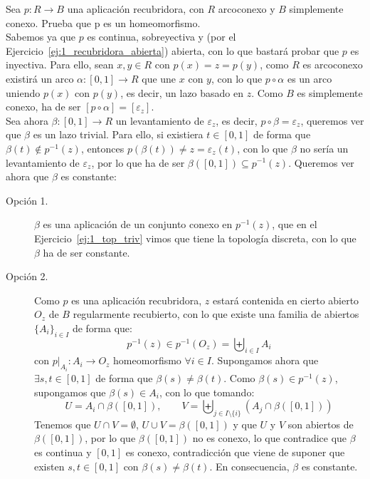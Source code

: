\begin{ejercicio}
   Sea $p:R\to B$ una aplicación recubridora, con $R$ arcoconexo y $B$ simplemente conexo. Prueba que p es un homeomorfismo.\\

   \noindent
   Sabemos ya que $p$ es continua, sobreyectiva y (por el Ejercicio~\ref{ej:1_recubridora_abierta}) abierta, con lo que bastará probar que $p$ es inyectiva. Para ello, sean $x,y\in R$ con $p(x) = z = p(y)$, como $R$ es arcoconexo existirá un arco $\alpha:[0,1]\to R$ que une $x$ con $y$, con lo que $p\circ \alpha$ es un arco uniendo $p(x)$ con $p(y)$, es decir, un lazo basado en $z$. Como $B$ es simplemente conexo, ha de ser $[p\circ \alpha] = [\varepsilon_z]$.\\

   \noindent
   Sea ahora $\beta:[0,1]\to R$ un levantamiento de $\varepsilon_z$, es decir, $p\circ \beta = \varepsilon_z$, queremos ver que $\beta$ es un lazo trivial. Para ello, si existiera $t\in [0,1]$ de forma que $\beta(t)\notin p^{-1}(z)$, entonces $p(\beta(t)) \neq z = \varepsilon_z(t)$, con lo que $\beta$ no sería un levantamiento de $\varepsilon_z$, por lo que ha de ser $\beta([0,1])\subseteq p^{-1}(z)$. Queremos ver ahora que $\beta$ es constante:
   \begin{description}
       \item [Opción 1.] $\beta$ es una aplicación de un conjunto conexo en $p^{-1}(z)$, que en el Ejercicio~\ref{ej:1_top_triv} vimos que tiene la topología discreta, con lo que $\beta$ ha de ser constante.
       \item [Opción 2.] Como $p$ es una aplicación recubridora, $z$ estará contenida en cierto abierto $O_z$ de $B$ regularmente recubierto, con lo que existe una familia de abiertos $\{A_i\}_{i \in I}$ de forma que:
           \begin{equation*}
               p^{-1}(z) \in p^{-1}(O_z) = \biguplus_{i \in I}A_i
           \end{equation*}
           con $p\big|_{A_i}:A_i\to O_z$ homeomorfismo $\forall i \in I$. Supongamos ahora que $\exists s,t\in [0,1]$ de forma que $\beta(s)\neq \beta(t)$. Como $\beta(s)\in p^{-1}(z)$, supongamos que $\beta(s) \in  A_i$, con lo que tomando: 
           \begin{equation*}
               U = A_i\cap \beta([0,1]), \qquad V = \biguplus_{j \in I\setminus\{i\}}(A_j \cap \beta([0,1]))
           \end{equation*}
           Tenemos que $U\cap V = \emptyset $, $U\cup V = \beta([0,1])$ y que $U$ y $V$ son abiertos de $\beta([0,1])$, por lo que $\beta([0,1])$ no es conexo, lo que contradice que $\beta$ es continua y $[0,1]$ es conexo, contradicción que viene de suponer que existen $s,t\in [0,1]$ con $\beta(s) \neq \beta(t)$. En consecuencia, $\beta$ es constante.

\end{description}
\end{ejercicio}
